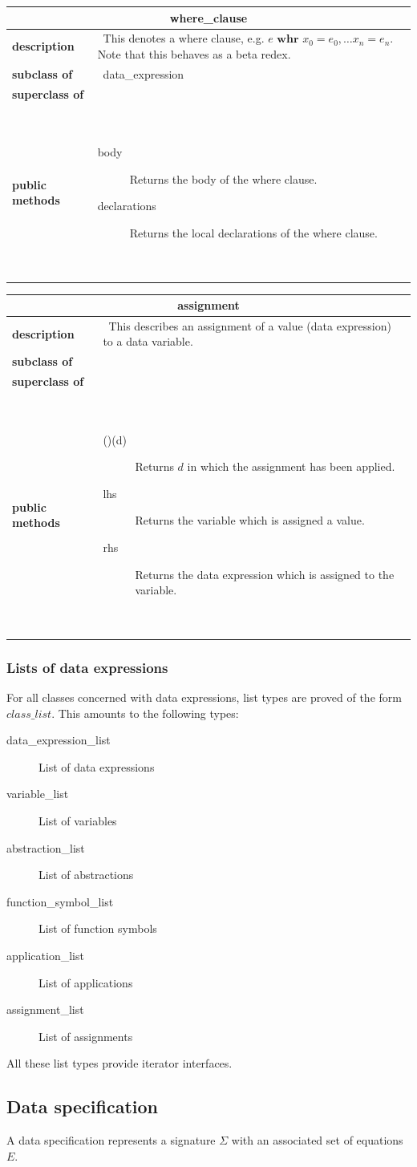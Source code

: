 \documentclass[a4paper,11pt]{article}
\newcommand{\dataclass}[5]{
\begin{flushleft}
\begin{longtable}{p{3cm} p{11cm}}
\multicolumn{2}{c}{\textbf{#1}}\\\hline\hline
\textbf{description} & ~#2~ \\\hline
\textbf{subclass of} & ~#3~ \\\hline
\textbf{superclass of} & ~#4~ \\\hline
\textbf{public methods} & ~#5~ \\\hline
\end{longtable}
\end{flushleft}
}
\begin{document}
\dataclass
  {where\_clause}
  {This denotes a where clause, e.g. $e \textbf{~whr~} x_0 = e_0, \dots x_n = e_n$. Note that this behaves as a beta redex.}
  {data\_expression}
  {}
  {\begin{description}
   \item[body] Returns the body of the where clause.
   \item[declarations] Returns the local declarations of the where clause.
  \end{description}}


\dataclass
  {assignment}
  {This describes an assignment of a value (data expression) to a data variable.}
  {}
  {}
  {\begin{description}
    \item[()(d)] Returns $d$ in which the assignment has been applied.
    \item[lhs] Returns the variable which is assigned a value.
    \item[rhs] Returns the data expression which is assigned to the variable.
   \end{description}}


\subsubsection{Lists of data expressions}
For all classes concerned with data expressions, list types are proved of the form $class\_list$. This amounts to the following types:
\begin{description}
 \item[data\_expression\_list] List of data expressions
 \item[variable\_list] List of variables
 \item[abstraction\_list] List of abstractions
 \item[function\_symbol\_list] List of function symbols
 \item[application\_list] List of applications
 \item[assignment\_list] List of assignments
\end{description}

All these list types provide iterator interfaces.

\FloatBarrier
\subsection{Data specification}
A data specification represents a signature $\Sigma$ with an associated set of equations $E$.
\end{document}
